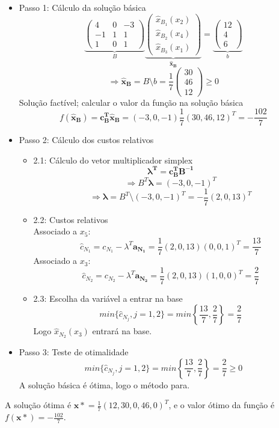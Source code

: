 \documentclass[a4paper, 12pt]{article}
\begin{document}
\begin{itemize}
\begin{itemize}
		\item Passo 1: Cálculo da solução básica
\[
\underbrace{
\begin{pmatrix}
4&0&-3\\
-1&1&1\\
1&0&1
\end{pmatrix}}_B
\underbrace{
\begin{pmatrix}
\hat{x}_{B_1} (x_2)\\
\hat{x}_{B_2} (x_4)\\
\hat{x}_{B_3} (x_1)
\end{pmatrix}}_{\mathbf{\hat{x}_B}}
=
\underbrace{
\begin{pmatrix}
12\\
4\\
6
\end{pmatrix}}_{b}
\]
\[
\Rightarrow \mathbf{\hat{x}_B} =  B \setminus b = \frac{1}{7}
\begin{pmatrix}
30\\
46\\
12
\end{pmatrix}
\geq 0
\]
Solução factível; calcular o valor da função na solução básica
\[
f(\mathbf{\hat{x}_B})=\mathbf{c_B^T\hat{x}_B}=(-3,0,-1) \frac{1}{7}(30,46,12)^T=-\frac{102}{7}
\]
		\item Passo 2: Cálculo dos custos relativos
		\begin{itemize}
\item 2.1: Cálculo do vetor multiplicador simplex
\[
\mathbf{\lambda^T}=\mathbf{c_B^TB^{-1}}
\]
\[
\Rightarrow B^T \mathbf{\lambda}=(-3, 0, -1)^T
\]
\[
\Rightarrow \mathbf{\lambda}=B^T \setminus (-3, 0, -1)^T=-\frac{1}{7}(2, 0, 13)^T
\]
\item 2.2: Custos relativos\\
Associado a $x_5$:
\[
\hat{c}_{N_1}=c_{N_1}-\lambda^T\mathbf{a_{N_1}}=\frac{1}{7}(2, 0, 13)(0,0,1)^T=\frac{13}{7}
\]
Associado a $x_3$:
\[
\hat{c}_{N_2}=c_{N_2}-\lambda^T\mathbf{a_{N_2}}=\frac{1}{7}(2, 0, 13)(1,0,0)^T=\frac{2}{7}
\]
\item 2.3: Escolha da variável a entrar na base
\[
min\{ \hat{c}_{N_j}, j=1,2\}=min\left\{\frac{13}{7}, \frac{2}{7}\right\}=\frac{2}{7}
\]
Logo  $\hat{x}_{N_2} (x_3)$ entrará na base. 
		\end{itemize}
		\item Passo 3: Teste de otimalidade
\[
min\{ \hat{c}_{N_j}, j=1,2\}=min\left\{\frac{13}{7}, \frac{2}{7}\right\}=\frac{2}{7}\geq0
\]
A solução básica é ótima, logo o método para.
	\end{itemize}
\end{itemize}
A solução ótima é $\mathbf{x*}=\frac{1}{7}(12,30,0,46,0)^T$, e o valor ótimo da função é $f(\mathbf{x*})=-\frac{102}{7}$.
\end{document}
